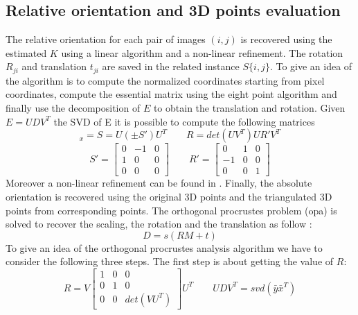 \documentclass[11pt]{article}
\begin{document}
\newpage
\subsection{Relative orientation and 3D points evaluation}
The relative orientation for each pair of images $(i,j)$ is recovered using the estimated $K$ using a linear algorithm and a non-linear refinement. The rotation $R_{ji}$ and translation $t_{ji}$ are saved in the related instance $S\{i,j\}$. To give an idea of the algorithm is to compute the normalized coordinates starting from pixel coordinates, compute the essential matrix using the eight point algorithm and finally use the decomposition of $E$ to obtain the translation and rotation.
Given $E = UDV^T$ the SVD of E it is possible to compute the following matrices
\begin{equation}
    [t]_x = S = U(\pm S')U^T \qquad
    R = det(UV^T)UR'V^T
\end{equation}
\begin{equation}
    S' = \begin{bmatrix}
        0 & -1 & 0 \\ 1 & 0 & 0 \\ 0 & 0 & 0
    \end{bmatrix} \qquad
    R' = \begin{bmatrix}
        0 & 1 & 0 \\ -1 & 0 & 0 \\ 0 & 0 & 1
    \end{bmatrix} 
\end{equation}
Moreover a non-linear refinement can be found in \cite{Horn}.
Finally, the absolute orientation is recovered using the original 3D points and the triangulated 3D points from corresponding points. The orthogonal procrustes problem (opa) is solved to recover the scaling, the rotation and the translation as follow \cite{Arun}:
\begin{equation}
    D=s(RM+t)
\end{equation}
To give an idea of the orthogonal procrustes analysis algorithm we have to consider the following three steps. The first step is about getting the value of $R$:
\begin{equation}
    R = V\begin{bmatrix}
        1 & 0 & 0 \\ 0 & 1 & 0 \\ 0 & 0 & det(VU^{T})
    \end{bmatrix} U^{T} \qquad UDV^{T} = svd(\bar{y}\bar{x}^T)
\end{equation}
\end{document}
